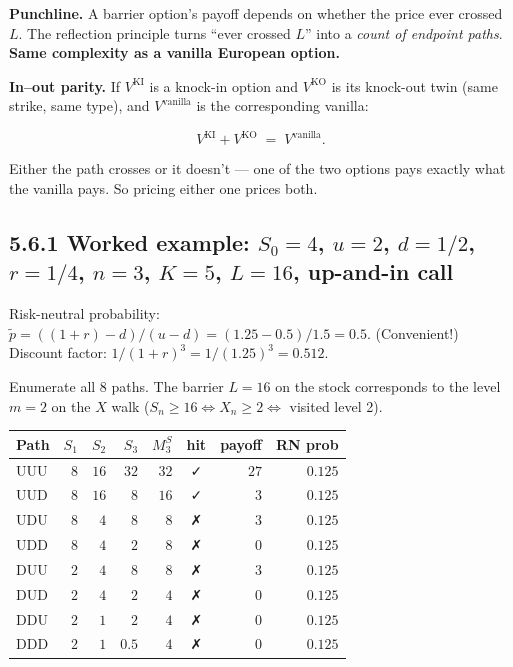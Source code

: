 \documentclass[
  10pt,
  twoside]{book}
\newcounter{none} %
\begin{document}
\textbf{Punchline.} A barrier option's payoff depends on whether the
price ever crossed \(L\). The reflection principle turns ``ever crossed
\(L\)'' into a \emph{count of endpoint paths}. \textbf{Same complexity
as a vanilla European option.}

\textbf{In--out parity.} If \(V^{\text{KI}}\) is a knock-in option and
\(V^{\text{KO}}\) is its knock-out twin (same strike, same type), and
\(V^{\text{vanilla}}\) is the corresponding vanilla:

\[\boxed{\;V^{\text{KI}} + V^{\text{KO}} \;=\; V^{\text{vanilla}}.\;}\]

Either the path crosses or it doesn't --- one of the two options pays
exactly what the vanilla pays. So pricing either one prices both.

\subsection{\texorpdfstring{5.6.1 Worked example: \(S_0 = 4\),
\(u = 2\), \(d = 1/2\), \(r = 1/4\), \(n = 3\), \(K = 5\), \(L = 16\),
up-and-in
call}{5.6.1 Worked example: S\_0 = 4, u = 2, d = 1/2, r = 1/4, n = 3, K = 5, L = 16, up-and-in call}}\label{worked-example-s_0-4-u-2-d-12-r-14-n-3-k-5-l-16-up-and-in-call}

Risk-neutral probability:
\(\tilde p = ((1+r) - d)/(u - d) = (1.25 - 0.5)/1.5 = 0.5\).
(Convenient!) Discount factor: \(1/(1+r)^3 = 1/(1.25)^3 = 0.512\).

Enumerate all 8 paths. The barrier \(L = 16\) on the stock corresponds
to the level \(m = 2\) on the \(X\) walk
(\(S_n \ge 16 \Leftrightarrow X_n \ge 2 \Leftrightarrow\) visited level
2).

{\def\LTcaptype{none} %
\begin{table}[H]
\centering
\begin{tabular}{|l|r|r|r|r|c|r|r|}
\toprule
Path & \(S_1\) & \(S_2\) & \(S_3\) & \(M^S_3\) & hit & payoff & RN
prob \\
\midrule



UUU & \(8\) & \(16\) & \(32\) & \(32\) & ✓ & \(27\) & \(0.125\) \\
UUD & \(8\) & \(16\) & \(8\) & \(16\) & ✓ & \(3\) & \(0.125\) \\
UDU & \(8\) & \(4\) & \(8\) & \(8\) & ✗ & \(3\) & \(0.125\) \\
UDD & \(8\) & \(4\) & \(2\) & \(8\) & ✗ & \(0\) & \(0.125\) \\
DUU & \(2\) & \(4\) & \(8\) & \(8\) & ✗ & \(3\) & \(0.125\) \\
DUD & \(2\) & \(4\) & \(2\) & \(4\) & ✗ & \(0\) & \(0.125\) \\
DDU & \(2\) & \(1\) & \(2\) & \(4\) & ✗ & \(0\) & \(0.125\) \\
DDD & \(2\) & \(1\) & \(0.5\) & \(4\) & ✗ & \(0\) & \(0.125\) \\
\bottomrule
\end{tabular}
\end{table}
}
\end{document}
